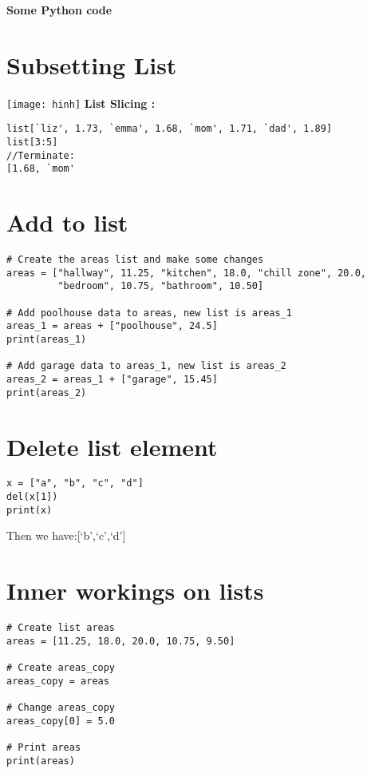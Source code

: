 \documentclass[12pt]{article}
\begin{document}
\begin{center}
\textbf{Some Python code}
\end{center}
\section{Subsetting List}
\texttt{[image: hinh]}
\textbf{List Slicing :}
\begin{lstlisting}
list[`liz', 1.73, `emma', 1.68, `mom', 1.71, `dad', 1.89]
list[3:5]
//Terminate:
[1.68, `mom'
\end{lstlisting}
\section{Add to list}
\begin{lstlisting}
# Create the areas list and make some changes
areas = ["hallway", 11.25, "kitchen", 18.0, "chill zone", 20.0,
         "bedroom", 10.75, "bathroom", 10.50]

# Add poolhouse data to areas, new list is areas_1
areas_1 = areas + ["poolhouse", 24.5]
print(areas_1) 

# Add garage data to areas_1, new list is areas_2
areas_2 = areas_1 + ["garage", 15.45]
print(areas_2)
\end{lstlisting}
\section{Delete list element}
\begin{lstlisting}
x = ["a", "b", "c", "d"]
del(x[1])
print(x)
\end{lstlisting}
Then we have:[`b',`c',`d']
\section{Inner workings on lists}
\begin{lstlisting}
# Create list areas
areas = [11.25, 18.0, 20.0, 10.75, 9.50]

# Create areas_copy
areas_copy = areas

# Change areas_copy
areas_copy[0] = 5.0

# Print areas
print(areas)
\end{lstlisting}
\end{document}
